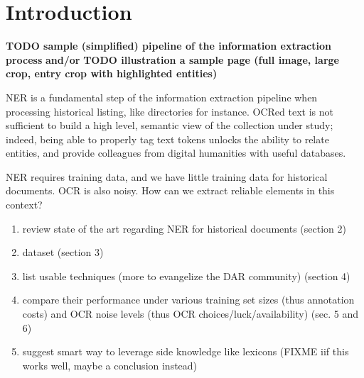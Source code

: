 \section{Introduction}

\textbf{TODO sample (simplified) pipeline of the information extraction process}
\textbf{and/or}
\textbf{TODO illustration a sample page (full image, large crop, entry crop with highlighted entities)}

NER is a fundamental step of the information extraction pipeline when processing historical listing, like directories for instance.
OCRed text is not sufficient to build a high level, semantic view of the collection under study;
indeed, being able to properly tag text tokens unlocks the ability to relate entities,
and provide colleagues from digital humanities with useful databases.

NER requires training data, and we have little training data for historical documents.
OCR is also noisy.
How can we extract reliable elements in this context?

\begin{enumerate}
    \item review state of the art regarding NER for historical documents (section 2)
    \item dataset (section 3)
    \item list usable techniques (more to evangelize the DAR community) (section 4)
    \item compare their performance under various training set sizes (thus annotation costs) and OCR noise levels (thus OCR choices/luck/availability) (sec. 5 and 6)
    \item suggest smart way to leverage side knowledge like lexicons (FIXME iif this works well, maybe a conclusion instead)
\end{enumerate}


